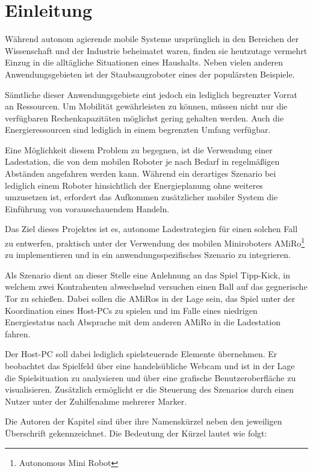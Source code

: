 \chapter[Einleitung]{Einleitung \hfill{}} \label{kap:einleitung} %

Während autonom agierende mobile Systeme ursprünglich in den Bereichen der Wissenschaft und der Industrie beheimatet waren, finden sie heutzutage vermehrt Einzug in die alltägliche Situationen eines Haushalts. Neben vielen anderen Anwendungsgebieten ist der Staubsaugroboter eines der populärsten Beispiele.

Sämtliche dieser Anwendungsgebiete eint jedoch ein lediglich begrenzter Vorrat an Ressourcen. Um Mobilität gewährleisten zu können, müssen nicht nur die verfügbaren Rechenkapazitäten möglichst gering gehalten werden. Auch die Energieressourcen sind lediglich in einem begrenzten Umfang verfügbar.

Eine Möglichkeit diesem Problem zu begegnen, ist die Verwendung einer Ladestation, die von dem mobilen Roboter je nach Bedarf in regelmäßigen Abständen angefahren werden kann. Während ein derartiges Szenario bei lediglich einem Roboter hinsichtlich der Energieplanung ohne weiteres umzusetzen ist, erfordert das Aufkommen zusätzlicher mobiler System die Einführung von vorausschauendem Handeln.

Das Ziel dieses Projektes ist es, autonome Ladestrategien für einen solchen Fall zu entwerfen, praktisch unter der Verwendung des mobilen Miniroboters AMiRo\footnote{Autonomous Mini Robot} zu implementieren und in ein anwendungsspezifisches Szenario zu integrieren.

Als Szenario dient an dieser Stelle eine Anlehnung an das Spiel Tipp-Kick, in welchem zwei Kontrahenten abwechselnd versuchen einen Ball auf das gegnerische Tor zu schießen. Dabei sollen die AMiRos in der Lage sein, das Spiel unter der Koordination eines Host-PCs zu spielen und im Falle eines niedrigen Energiestatus nach Absprache mit dem anderen AMiRo in die Ladestation fahren.

Der Host-PC soll dabei lediglich spielsteuernde Elemente übernehmen. Er beobachtet das Spielfeld über eine handelsübliche Webcam und ist in der Lage die Spielsituation zu analysieren und über eine grafische Benutzeroberfläche zu visualisieren. Zusätzlich ermöglicht er die Steuerung des Szenarios durch einen Nutzer unter der Zuhilfenahme mehrerer Marker.

Die Autoren der Kapitel sind über ihre Namenskürzel neben den jeweiligen Überschrift gekennzeichnet. Die Bedeutung der Kürzel lautet wie folgt:

